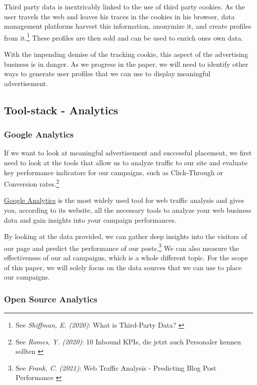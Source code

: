 Third party data is inextricably linked to the use of third party cookies. As the user travels the web and leaves his traces in the cookies in his browser, data management platforms harvest this information, anonymize it, and create profiles from it.\footnote{See \textit{Shiffman, E. (2020)}: What is Third-Party Data? \cite{thirdParty}} These profiles are then sold and can be used to enrich ones own data.

With the impending demise of the tracking cookie, this aspect of the advertising business is in danger. As we progress in the paper, we will need to identify other ways to generate user profiles that we can use to display meaningful advertisement.

\subsection{Tool-stack - Analytics}

\subsubsection{Google Analytics}

If we want to look at meaningful advertisement and successful placement, we first need to look at the tools that allow us to analyze traffic to our site and evaluate key performance indicators for our campaigns, such as Click-Through or Conversion rates.\footnote{See \textit{Romes, Y. (2020)}: 10 Inbound KPIs, die jetzt auch Personaler kennen sollten \cite{inboundKPI}}

\href{https://analytics.google.com/}{Google Analytics} is the most widely used tool for web traffic analysis and gives you, according to its website, all the necessary tools to analyze your web business data and gain insights into your campaign performances.

By looking at the data provided, we can gather deep insights into the visitors of our page and predict the performance of our posts.\footnote{See \textit{Frank, C. (2021)}: Web Traffic Analysis - Predicting Blog Post Performance \cite{previousBigdata}} We can also measure the effectiveness of our ad campaigns, which is a whole different topic. For the scope of this paper, we will solely focus on the data sources that we can use to place our campaigns.

\subsubsection{Open Source Analytics}

